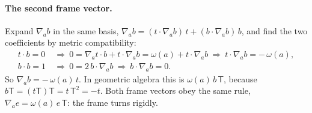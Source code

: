 \paragraph{The second frame vector.} Expand $\nabla_a b$ in the same basis, $\nabla_a b = (t\cdot\nabla_a b)\,t + (b\cdot\nabla_a b)\,b$, and find the two coefficients by metric compatibility:
\begin{align*}
t\cdot b = 0 &\ \Longrightarrow\ 0 = \nabla_a t\cdot b + t\cdot\nabla_a b = \omega(a) + t\cdot\nabla_a b \ \Longrightarrow\ t\cdot\nabla_a b = -\,\omega(a) , \\
b\cdot b = 1 &\ \Longrightarrow\ 0 = 2\, b\cdot\nabla_a b \ \Longrightarrow\ b\cdot\nabla_a b = 0 .
\end{align*}
So $\nabla_a b = -\,\omega(a)\, t$. In geometric algebra this is $\omega(a)\, b\,\mathsf T$, because $b\mathsf T = (t\mathsf T)\mathsf T = t\,\mathsf T^2 = -t$. Both frame vectors obey the same rule, $\nabla_a e = \omega(a)\, e\,\mathsf T$: the frame turns rigidly.


